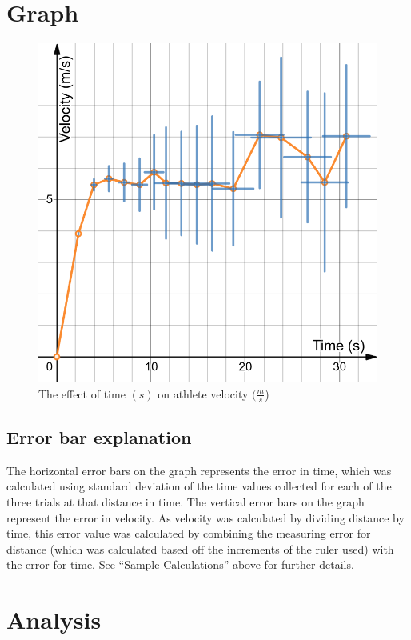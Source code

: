 \documentclass[index]{subfiles}
\begin{document}
\section{Graph}

\begin{figure}[H]
    \centering
    \caption{The effect of time \((s)\) on athlete velocity \((\frac{m}{s}\))}
    \includegraphics[scale=0.3]{pics/velocity-time.png}
\end{figure}

\subsection*{Error bar explanation}

The horizontal error bars on the graph represents the error in time, which was calculated using standard deviation of the time values collected for each of the three trials at that distance in time. The vertical error bars on the graph represent the error in velocity. As velocity was calculated by dividing distance by time, this error value was calculated by combining the measuring error for distance (which was calculated based off the increments of the ruler used) with the error for time. See ``Sample Calculations'' above for further details.

\section{Analysis}
\end{document}
